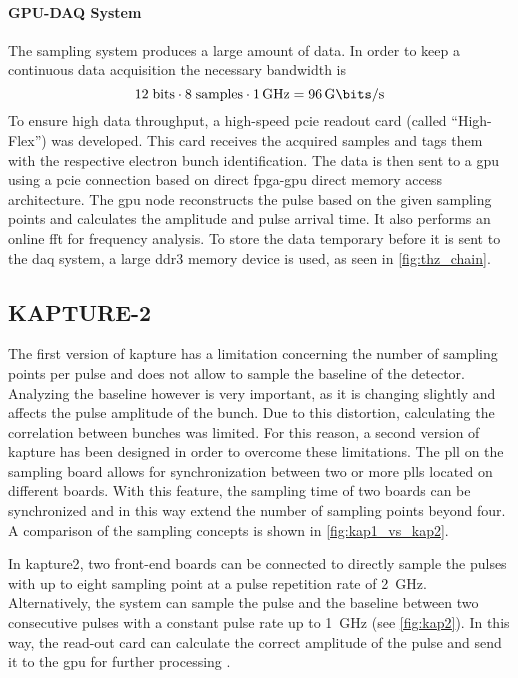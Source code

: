 \paragraph{GPU-DAQ System}
The sampling system produces a large amount of data.
In order to keep a continuous data  acquisition the necessary bandwidth is 
\begin{equation}
	12\;\text{bits} \cdot 8 \; \text{samples} \cdot \SI{1}{\GHz} = \SI{96}{\giga \bits \per \second}
\end{equation}
To ensure high data throughput, a high-speed \gls{pcie} readout card (called ``High-Flex'') was developed.
This card receives the acquired samples and tags them with the respective electron bunch identification. 
The data is then sent to a \gls{gpu} using a \gls{pcie} connection based on direct \gls{fpga}-\gls{gpu} direct memory access architecture.
The \gls{gpu} node reconstructs the pulse based on the given sampling points and calculates the amplitude and pulse arrival time. 
It also performs an online \gls{fft} for frequency analysis.
To store the data temporary before it is sent to the \gls{daq} system, a large \gls{ddr3} memory device is used, as seen in \autoref{fig:thz_chain}. \cite{caselleKAP}

\clearpage
\subsection{KAPTURE-2}
The first version of \gls{kapture} has a limitation concerning the number of sampling points per pulse and does not allow to sample the baseline of the detector.
Analyzing the baseline however is very important, as it is changing slightly and affects the pulse amplitude of the bunch. 
Due to this distortion, calculating the correlation between bunches was limited. 
For this reason, a second version of \gls{kapture} has been designed in order to overcome these limitations. 
The \gls{pll} on the sampling board allows for synchronization between two or more \glspl{pll} located on different boards.
With this feature, the sampling time of two boards can be synchronized and in this way extend the number of sampling points beyond four.
A comparison of the sampling concepts is shown in \autoref{fig:kap1_vs_kap2}.

In \gls{kapture2}, two front-end boards can be connected to directly sample the pulses with up to eight sampling point at a pulse repetition rate of \SI{2}{\GHz}. 
Alternatively, the system can sample the pulse and the baseline between two consecutive pulses with a constant pulse rate up to \SI{1}{\GHz} (see \autoref{fig:kap2}).
In this way, the read-out card can calculate the correct amplitude of the pulse and send it to the \gls{gpu} for further processing \cite{caselleKAP}.

